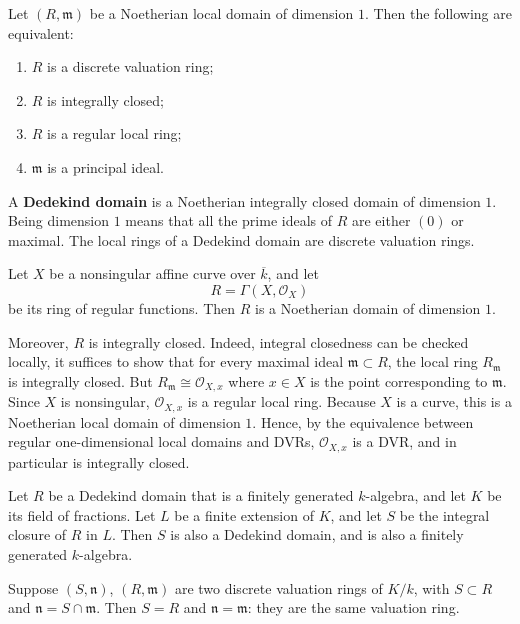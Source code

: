 \documentclass[12pt]{article}
\begin{document}
\begin{theorem}
    Let $(R,\mathfrak m)$ be a Noetherian local domain of dimension $1$. Then the following are equivalent:
    \begin{enumerate}
        \item $R$ is a discrete valuation ring;
        \item $R$ is integrally closed;
        \item $R$ is a regular local ring;
        \item $\mathfrak m$ is a principal ideal.
    \end{enumerate}
\end{theorem}

A \textbf{Dedekind domain} is a Noetherian integrally closed domain of dimension $1$. Being dimension $1$ means that all the prime ideals of $R$ are either $(0)$ or maximal. The local rings of a Dedekind domain are discrete valuation rings.

\begin{example}
    Let $X$ be a nonsingular affine curve over $\overline{k}$, and let
    \[
        R=\Gamma(X,\mathcal O_X)
    \]
    be its ring of regular functions. Then $R$ is a Noetherian domain of dimension $1$.

    Moreover, $R$ is integrally closed. Indeed, integral closedness can be checked locally, it suffices to show that for every maximal ideal $\mathfrak m\subset R$, the local ring $R_{\mathfrak m}$ is integrally closed. But $R_{\mathfrak m}\cong \mathcal O_{X,x}$
    where $x\in X$ is the point corresponding to $\mathfrak m$. Since $X$ is nonsingular, $\mathcal O_{X,x}$ is a regular local ring. Because $X$ is a curve, this is a Noetherian local domain of dimension $1$. Hence, by the equivalence between regular one-dimensional local domains and DVRs, $\mathcal O_{X,x}$ is a DVR, and in particular is integrally closed.
\end{example}

\begin{theorem}
    Let $R$ be a Dedekind domain that is a finitely generated $k$-algebra, and let $K$ be its field of fractions. Let $L$ be a finite extension of $K$, and let $S$ be the integral closure of $R$ in $L$. Then $S$ is also a Dedekind domain, and is also a finitely generated $k$-algebra.
\end{theorem}

\begin{lemma}
    Suppose $(S,\mathfrak n)$, $(R,\mathfrak m)$ are two discrete valuation rings of $K/k$, with $S \subset R$ and $\mathfrak n = S \cap \mathfrak m$. Then $S = R$ and $\mathfrak n = \mathfrak m$: they are the same valuation ring.
\end{lemma}
\end{document}
